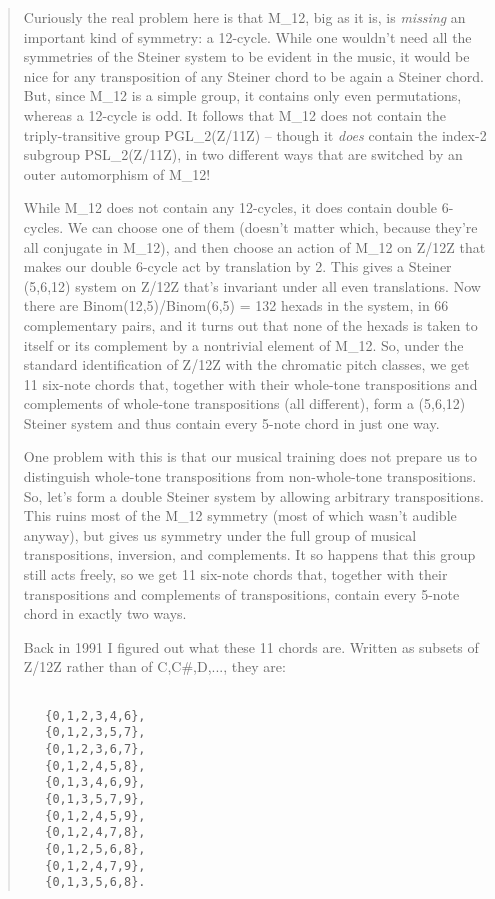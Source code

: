 \begin{quote}
Curiously the real problem here is that M_{12}, big as it is,
is \emph{missing} an important kind of symmetry: a 12-cycle.
While one wouldn't need all the symmetries of the Steiner system
to be evident in the music, it would be nice for any transposition
of any Steiner chord to be again a Steiner chord.  But, since
M_{12} is a simple group, it contains only even permutations,
whereas a 12-cycle is odd.  It follows that M_{12} does not contain
the triply-transitive group PGL_{2}(Z/11Z) -- though it \emph{does}
contain the index-2 subgroup PSL_{2}(Z/11Z), in two different ways
that are switched by an outer automorphism of M_{12}!

While M_{12} does not contain any 12-cycles, it does contain
double 6-cycles.  We can choose one of them (doesn't matter which,
because they're all conjugate in M_{12}), and then choose an
action of M_{12} on Z/12Z that makes our double 6-cycle act by
translation by 2.  This gives a Steiner (5,6,12) system on Z/12Z
that's invariant under all even translations.  Now there are
Binom(12,5)/Binom(6,5) = 132 hexads in the system, in 66 complementary
pairs, and it turns out that none of the hexads is taken to itself or
its complement by a nontrivial element of M_{12}.  So, under
the standard identification of Z/12Z with the chromatic pitch classes,
we get 11 six-note chords that, together with their whole-tone
transpositions and complements of whole-tone transpositions (all
different), form a (5,6,12) Steiner system and thus contain every
5-note chord in just one way.

One problem with this is that our musical training does not prepare us
to distinguish whole-tone transpositions from non-whole-tone
transpositions.  So, let's form a double Steiner system by allowing
arbitrary transpositions.  This ruins most of the M_{12} symmetry
(most of which wasn't audible anyway), but gives us symmetry
under the full group of musical transpositions, inversion,
and complements.  It so happens that this group still acts freely,
so we get 11 six-note chords that, together with their
transpositions and complements of transpositions, contain
every 5-note chord in exactly two ways.

Back in 1991 I figured out what these 11 chords are.
Written as subsets of Z/12Z rather than of {C,C#,D,...},
they are:

\begin{verbatim}

   {0,1,2,3,4,6},
   {0,1,2,3,5,7},
   {0,1,2,3,6,7},
   {0,1,2,4,5,8},
   {0,1,3,4,6,9},
   {0,1,3,5,7,9},
   {0,1,2,4,5,9},
   {0,1,2,4,7,8},
   {0,1,2,5,6,8},
   {0,1,2,4,7,9},
   {0,1,3,5,6,8}.
\end{verbatim}
    

\end{quote}
